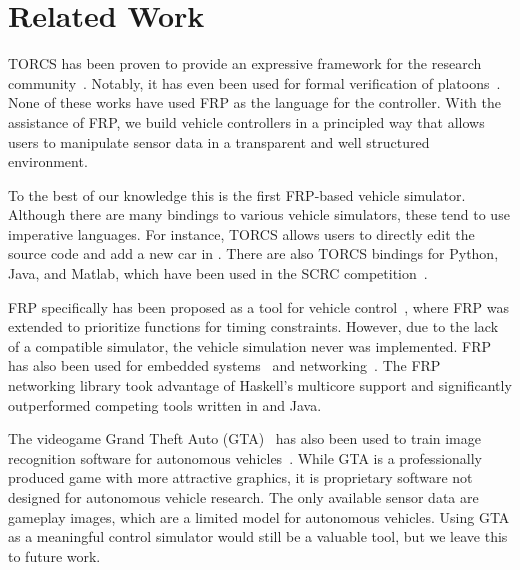 \section{Related Work}

TORCS has been proven to provide an expressive framework for the research community~\cite{OnievaPAMP09,conf/cig/CardamoneLL09,conf/cig/MunozGS10}. 
Notably, it has even been used for formal verification of platoons~\cite{kamali2016formal,xu2016experimental}. 
None of these works have used FRP as the language for the controller.
With the assistance of FRP, we build vehicle controllers in a principled way that allows users to manipulate sensor data in a transparent and well structured environment.

To the best of our knowledge this is the first FRP-based vehicle simulator.
Although there are many bindings to various vehicle simulators, these tend to use imperative languages.
For instance, TORCS allows users to directly edit the source code and add a new car in \CC.
There are also TORCS bindings for Python, Java, and Matlab, which have been used in the SCRC competition~\cite{SCRC}.

FRP specifically has been proposed as a tool for vehicle control~\cite{kazemi2016,zou2016}, where FRP was extended to prioritize functions for timing constraints. However, due to the lack of a compatible simulator, the vehicle simulation never was implemented. 
FRP has also been used for embedded systems~\cite{helbling2016juniper} and networking~\cite{voellmy2012scalable}.
The FRP networking library took advantage of Haskell's multicore support and significantly outperformed competing tools written in \CC and Java.

The videogame Grand Theft Auto (GTA)~\cite{gtaV} has also been used to train image recognition software for autonomous vehicles~\cite{gtaPrinceton}.
While GTA is a professionally produced game with more attractive graphics, it is proprietary software not designed for autonomous vehicle research.
The only available sensor data are gameplay images, which are a limited model for autonomous vehicles.
Using GTA as a meaningful control simulator would still be a valuable tool, but we leave this to future work.
